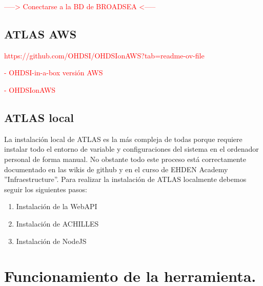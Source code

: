 \documentclass{article}
\begin{document}
\textcolor{red}{-----> Conectarse a la BD de BROADSEA <-----}










\newpage
\subsection{ATLAS AWS}\label{cap:AtlasAWS}

\textcolor{red}{https://github.com/OHDSI/OHDSIonAWS?tab=readme-ov-file}

\textcolor{red}{- OHDSI-in-a-box versión AWS}

\textcolor{red}{- OHDSIonAWS}


\subsection{ATLAS local }

La instalación local de ATLAS es la más compleja de todas porque requiere instalar todo el entorno de variable y configuraciones del sistema en el ordenador personal de forma manual. No obstante todo este proceso está correctamente documentado en las wikis de github \cite{AtlasSetup} y en el curso de EHDEN Academy \cite{EHDENAcademy} ''Infraestructure''. Para realizar la instalación de ATLAS localmente debemos seguir los siguientes pasos:

\begin{enumerate}
    \item Instalación de la WebAPI
    \item Instalación de ACHILLES
    \item Instalación de NodeJS
\end{enumerate}


\newpage
\section{Funcionamiento de la herramienta.}




\newpage


\end{document}
